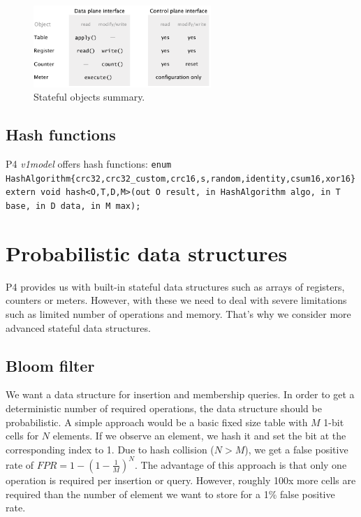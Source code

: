 \documentclass[11pt,oneside,a4paper]{article}
\begin{document}
\begin{figure}[b!]
	\centering
	\includegraphics[width=0.6\textwidth,scale=1]{figures/stateful_objects_summary}
	\caption{Stateful objects summary. 	\cite{advnet}}
	\label{fig:stateful_objects_summary}
\end{figure}

\subsection{Hash functions}

P4 \textit{v1model} offers hash functions: \newline
\texttt{enum HashAlgorithm\{crc32,crc32\_custom,crc16,s,random,identity,csum16,xor16\}} \newline
\texttt{extern void hash<O,T,D,M>(out O result, in HashAlgorithm algo, in T base, in D data, in M max);}

\newpage

\section{Probabilistic data structures}

P4 provides us with built-in stateful data structures such as arrays of registers, counters or meters. However, with these we need to deal with severe limitations such as limited number of operations and memory. That's why we consider more advanced stateful data structures.

\subsection{Bloom filter}

We want a data structure for insertion and membership queries. In order to get a deterministic number of required operations, the data structure should be probabilistic. A simple approach would be a basic fixed size table with $M$ 1-bit cells for $N$ elements. If we observe an element, we hash it and set the bit at the corresponding index to 1. Due to hash collision ($N > M$), we get a false positive rate of $FPR = 1 - (1-\frac{1}{M})^N$. The advantage of this approach is that only one operation is required per insertion or query. However, roughly 100x more cells are required than the number of element we want to store for a 1\% false positive rate. \newline
\end{document}
